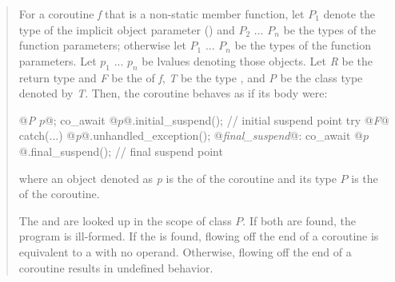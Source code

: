 \begin{quote}
\pnum
For a coroutine \textit{f} that is a non-static member function, let $P_1$ denote the type of the implicit object parameter () and $P_2$ ... $P_n$ be the types of the function parameters; otherwise let $P_1$ ... $P_n$ be the types of the function parameters. Let $p_1$ ... $p_n$ be lvalues denoting those objects.
Let \textit{R} be the return type and \textit{F} be the 
of \textit{f}, \textit{T} be the type , and \textit{P} be the class type denoted by \textit{T}. 
Then, the coroutine behaves as if its body were:
\begin{codeblock}
  {
     @\textit{P }$p$@;
     co_await @$p$@.initial_suspend(); // initial suspend point
     try { @\textit{F}@ } catch(...) { @\textit{p}@.unhandled_exception(); }
  @\textit{final_suspend}@:
     co_await @$p$@.final_suspend(); // final suspend point
  }
\end{codeblock}
where an object denoted as \textit{p} is the  of
the coroutine and its type $P$ is the 
of the coroutine.

\pnum
The 
 and  are looked up in the scope of class $P$. 
If both are found, the program is ill-formed. 
If the   is found, flowing off the end of a coroutine is equivalent to a  with no operand. Otherwise, flowing off the end of a coroutine results in undefined behavior.




\end{quote}
